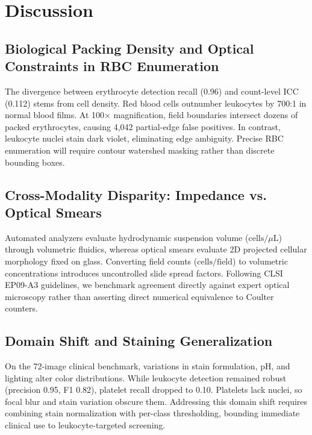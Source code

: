 \documentclass[10pt,conference]{IEEEtran}
\begin{document}
\section{Discussion}
\label{sec:discussion}

\subsection{Biological Packing Density and Optical Constraints in RBC Enumeration}
The divergence between erythrocyte detection recall (0.96) and count-level ICC (0.112) stems from cell density. Red blood cells outnumber leukocytes by 700:1 in normal blood films. At 100$\times$ magnification, field boundaries intersect dozens of packed erythrocytes, causing 4,042 partial-edge false positives. In contrast, leukocyte nuclei stain dark violet, eliminating edge ambiguity. Precise RBC enumeration will require contour watershed masking rather than discrete bounding boxes.

\subsection{Cross-Modality Disparity: Impedance vs. Optical Smears}
Automated analyzers evaluate hydrodynamic suspension volume ($\text{cells}/\mu\text{L}$) through volumetric fluidics, whereas optical smears evaluate 2D projected cellular morphology fixed on glass. Converting field counts ($\text{cells}/\text{field}$) to volumetric concentrations introduces uncontrolled slide spread factors. Following CLSI EP09-A3 guidelines, we benchmark agreement directly against expert optical microscopy rather than asserting direct numerical equivalence to Coulter counters.

\subsection{Domain Shift and Staining Generalization}
On the 72-image clinical benchmark, variations in stain formulation, pH, and lighting alter color distributions. While leukocyte detection remained robust (precision 0.95, F1 0.82), platelet recall dropped to 0.10. Platelets lack nuclei, so focal blur and stain variation obscure them. Addressing this domain shift requires combining stain normalization with per-class thresholding, bounding immediate clinical use to leukocyte-targeted screening.
\end{document}
